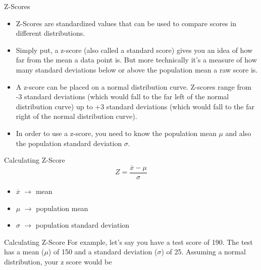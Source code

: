 \documentclass[10pt,dvipsnames, aspectratio=169]{beamer}
\begin{document}
\begin{frame}[t]{Z-Scores}
	\begin{itemize}
		\item Z-Scores are standardized values that can be used to compare 
		scores in different distributions.
		\item Simply put, a z-score (also called a standard score) gives you an 
		idea of how far from the mean a data point is. But more technically 
		it’s a measure of how many standard deviations below or above the 
		population mean a raw score is.
		\item A z-score can be placed on a normal distribution curve. Z-scores 
		range from -3 standard deviations (which would fall to the far left of 
		the normal distribution curve) up to +3 standard deviations (which 
		would fall to the far right of the normal distribution curve). 
		\item In order 
		to use a z-score, you need to know the population mean $\mu$ and also 
		the 
		population standard deviation $\sigma$.
	\end{itemize}
	
\end{frame}

\begin{frame}[t]{Calculating Z-Score}
	$$
	Z = \frac{\overline{x}-\mu}{\sigma}
	$$
	
	\begin{itemize}
		\item $\overline{x}$ $\rightarrow$ mean 
		\item $\mu$ $\rightarrow$ population mean 
		\item $\sigma$ $\rightarrow$ population standard deviation
	\end{itemize}
\end{frame}


\begin{frame}[t]{Calculating Z-Score}
	For example, let’s say you have a test score of 190. The test has a mean 
	($\mu$) of 150 and a standard deviation ($\sigma$) of 25. Assuming a normal 
	distribution, your z score would be
	
\end{frame}
\end{document}
